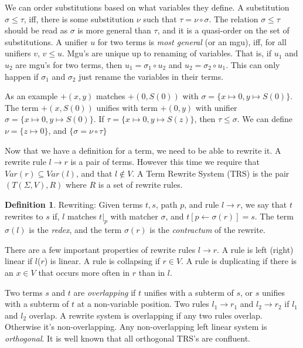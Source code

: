 \documentclass{book}
\theoremstyle{definition}
\newtheorem{definition}{Definition}[section]
\renewcommand{\leq}{\leqslant}
\begin{document}
We can order substitutions based on what variables they define.
A substitution $\sigma \leq \tau$, iff,
there is some substitution $\nu$ such that $\tau = \nu \circ \sigma$.
The relation $\sigma \leq \tau$ should be read as $\sigma$ is more general than $\tau$,
and it is a quasi-order on the set of substitutions.
A unifier $u$ for two terms is \textit{most general} (or an mgu), iff, for all unifiers $v$, $v \le u$.
Mgu's are unique up to renaming of variables.
That is, if $u_1$ and $u_2$ are mgu's for two terms, then $u_1 = \sigma_1 \circ u_2$
and $u_2 = \sigma_2 \circ u_1$.
This can only happen if $\sigma_1$ and $\sigma_2$ just rename the variables in their terms.

As an example $+(x,y)$ matches $+(0, S(0))$ with $\sigma = \{x \mapsto 0, y \mapsto S(0)\}$.
The term $+(x, S(0))$ unifies with term $+(0, y)$ with unifier
$\sigma = \{x \mapsto 0, y \mapsto S(0)\}$.
If $\tau = \{x \mapsto 0, y \mapsto S(z)\}$, then $\tau \le \sigma$.  We can define $\nu = \{z \mapsto 0\}$,
and $\{\sigma = \nu \circ \tau\}$

Now that we have a definition for a term, we need to be able to rewrite it.
A rewrite rule $l \to r$ is a pair of terms.
However this time we require that $Var(r) \subseteq Var(l)$, and that $l \not \in V$.
A Term Rewrite System (TRS) is the pair $(T(\Sigma,V),R)$ where $R$ is a set of rewrite rules.


\theoremstyle{definition}
\begin{definition}{Rewriting:}
Given terms $t,s$, path $p$, and rule $l \to r$, we say that $t$ rewrites to $s$ if, 
$l$ matches $t\vert_p$ with matcher $\sigma$, and $t[p \leftarrow \sigma(r)] = s$.
The term $\sigma(l)$ is the \textit{redex}, and the term $\sigma(r)$ is the \textit{contractum}
of the rewrite.
\end{definition}

There are a few important properties of rewrite rules $l \to r$.
A rule is left (right) linear if $l$($r$) is linear.
A rule is collapsing if $r \in V$.
A rule is duplicating if there is an $x \in V$ that occurs more often in $r$ than in $l$.

Two terms $s$ and $t$ are \textit{overlapping} if $t$ unifies with a subterm of $s$,
or $s$ unifies with a subterm of $t$ at a non-variable position.
Two rules $l_1 \to r_1$ and $l_2 \to r_2$ if $l_1$ and $l_2$ overlap.
A rewrite system is overlapping if any two rules overlap.  Otherwise it's non-overlapping.
Any non-overlapping left linear system is \textit{orthogonal}.
It is well known that all orthogonal TRS's are confluent. \cite{AdvancedTRS}\\
\end{document}
